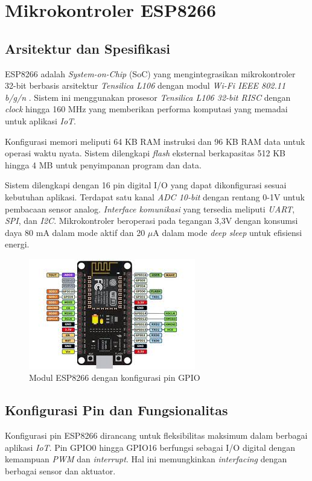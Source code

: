 \section{Mikrokontroler ESP8266}

\subsection{Arsitektur dan Spesifikasi}
ESP8266 adalah \textit{System-on-Chip} (SoC) yang mengintegrasikan mikrokontroler 32-bit berbasis arsitektur \textit{Tensilica L106} dengan modul \textit{Wi-Fi IEEE 802.11 b/g/n} \citep{rodrigues2018vision}. Sistem ini menggunakan prosesor \textit{Tensilica L106 32-bit RISC} dengan \textit{clock} hingga 160 MHz yang memberikan performa komputasi yang memadai untuk aplikasi \textit{IoT}. 

Konfigurasi memori meliputi 64 KB RAM instruksi dan 96 KB RAM data untuk operasi waktu nyata. Sistem dilengkapi \textit{flash} eksternal berkapasitas 512 KB hingga 4 MB untuk penyimpanan program dan data. 

Sistem dilengkapi dengan 16 pin digital I/O yang dapat dikonfigurasi sesuai kebutuhan aplikasi. Terdapat satu kanal \textit{ADC 10-bit} dengan rentang 0-1V untuk pembacaan sensor analog. \textit{Interface komunikasi} yang tersedia meliputi \textit{UART}, \textit{SPI}, dan \textit{I2C}. Mikrokontroler beroperasi pada tegangan 3,3V dengan konsumsi daya 80 mA dalam mode aktif dan 20 $\mu$A dalam mode \textit{deep sleep} untuk efisiensi energi.

\begin{figure}
    \centering
    \includegraphics[width=0.5\linewidth]{images/esp 8266.jpg}
    \caption{Modul ESP8266 dengan konfigurasi pin GPIO}
    \label{fig:teori-figure-3}
\end{figure}

\subsection{Konfigurasi Pin dan Fungsionalitas}
Konfigurasi pin ESP8266 dirancang untuk fleksibilitas maksimum dalam berbagai aplikasi \textit{IoT}. Pin GPIO0 hingga GPIO16 berfungsi sebagai I/O digital dengan kemampuan \textit{PWM} dan \textit{interrupt}. Hal ini memungkinkan \textit{interfacing} dengan berbagai sensor dan aktuator. 

